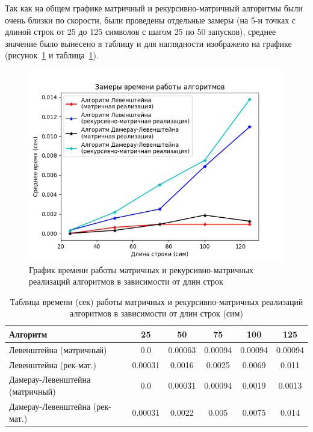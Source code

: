 \hspace{1.25cm}
Так как на общем графике матричный и рекурсивно-матричный алгоритмы были очень близки по скорости, были проведены отдельные замеры (на 5-и точках с длиной строк от 25 до 125 символов с шагом 25 по 50 запусков), среднее значение было вынесено в таблицу и для наглядности изображено на графике (рисунок~\ref{fig:graph_mat_rec-mat} и таблица~\ref{table:table_mat_rec-mat}).

\begin{figure}[H]
    \centering
    \includegraphics[width=1\textwidth]{img/graph_mat_rec-mat.png}
    \caption{График времени работы матричных и рекурсивно-матричных реализаций алгоритмов в зависимости от длин строк}
    \label{fig:graph_mat_rec-mat}
\end{figure}

\begin{table}[H]
    \centering
    \caption{Таблица времени (сек) работы матричных и рекурсивно-матричных реализаций алгоритмов в зависимости от длин строк (сим)}
    \begin{tabular}{|l|c|c|c|c|c|}
        \hline
        \textbf{Алгоритм} & \textbf{25} & \textbf{50} & \textbf{75} & \textbf{100} & \textbf{125}\\
        \hline
        Левенштейна (матричный) & 0.0 & 0.00063 & 0.00094 & 0.00094 & 0.00094 \\
        Левенштейна (рек-мат.) & 0.00031 & 0.0016 & 0.0025 & 0.0069 & 0.011 \\
        Дамерау-Левенштейна (матричный) & 0.0 & 0.00031 & 0.00094 & 0.0019 & 0.0013 \\
        Дамерау-Левенштейна (рек-мат.) & 0.00031 & 0.0022 & 0.005 & 0.0075 & 0.014 \\
        \hline
    \end{tabular}
    \label{table:table_mat_rec-mat}
\end{table}

